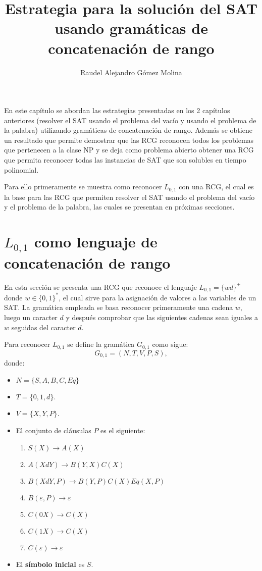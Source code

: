 \documentclass[12pt]{article}
\title{Estrategia para la solución del SAT usando gramáticas de concatenación de rango}
\author{Raudel Alejandro Gómez Molina}
\begin{document}
\maketitle

En este capítulo se abordan las estrategias presentadas en los 2 capítulos anteriores
(resolver el SAT usando el problema del vacío y usando el problema de la palabra)
utilizando gramáticas de concatenación
de rango. Además se obtiene un resultado que permite demostrar que las RCG reconocen
todos los problemas que pertenecen a la clase NP y se deja como problema abierto
obtener una RCG que permita reconocer todas las instancias de SAT que son solubles en
tiempo polinomial.

Para ello primeramente se muestra como reconocer $L_{0,1}$ con una RCG, el cual es la base para las RCG que permiten
resolver el SAT usando el problema del vacío y el problema de la palabra, las cuales se presentan en próximas
secciones.

\section{$L_{0,1}$ como lenguaje de concatenación de rango}

En esta sección se presenta una RCG que reconoce el lenguaje $L_{0,1}=\{wd\}^+$ donde $w\in \{0,1\}^*$, el cual sirve para la asignación de valores a las variables de un SAT. La gramática empleada se basa reconocer
primeramente una cadena $w$, luego un caracter $d$ y después comprobar que las siguientes cadenas sean iguales a $w$ seguidas
del caracter $d$.

Para reconocer $L_{0,1}$ se define la gramática $G_{0,1}$ como sigue:
\[
    G_{0,1} = (N, T, V, P, S),
\]
donde:

\begin{itemize}
    \item $N=\{S,A,B,C,Eq\}$
    \item $T=\{0,1,d\}$.
    \item $V=\{X,Y,P\}$.
    \item El conjunto de cláusulas $P$ es el siguiente:
          \begin{enumerate}
              \item $S(X)\to A(X)$
              \item $A(XdY)\to B(Y,X)C(X)$
              \item $B(XdY,P)\to B(Y,P) C(X) Eq(X,P)$
              \item $B(\varepsilon,P)\to \varepsilon$
              \item $C(0X)\to C(X)$
              \item $C(1X)\to C(X)$
              \item $C(\varepsilon)\to \varepsilon$
          \end{enumerate}
    \item El \textbf{símbolo inicial} es $S$.
\end{itemize}
\end{document}
